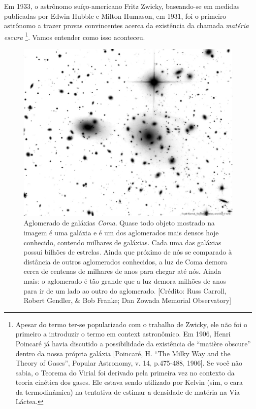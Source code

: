 \documentclass[]{IMTexam}
\author{Isabella B.}
\date{}
\begin{document}
\maketitle

\begin{questions}

	 \label{ques:q1}

	Em 1933, o astrônomo suíço-americano Fritz Zwicky, baseando-se em medidas publicadas por Edwin Hubble e Milton Humason, em 1931, foi o primeiro astrônomo a trazer provas convincentes acerca da existência da chamada \textit{matéria escura}%
	\footnote{Apesar do termo ter-se popularizado com o trabalho de Zwicky, ele não foi o primeiro a introduzir o termo em context astronômico. Em 1906, Henri Poincaré já havia discutido a possibilidade da existência de “matière obscure” dentro da nossa própria galáxia [Poincaré, H. “The Milky Way and the Theory of Gases”, Popular Astronomy, v. 14, p.475-488, 1906]. Se você não sabia, o Teorema do Virial foi derivado pela primeira vez no contexto da teoria cinética dos gases. Ele estava sendo utilizado por Kelvin (sim, o cara da termodinâmica) na tentativa de estimar a densidade de matéria na Via Láctea.}. Vamos entender como isso aconteceu.

	\begin{figure}[H]
		\centering
		\includegraphics[width=0.4\linewidth]{screenshot001}
		\caption{Aglomerado de galáxias \textit{Coma}. Quase todo objeto mostrado na imagem é uma galáxia e é um dos aglomerados mais densos hoje conhecido, contendo milhares de galáxias. Cada uma das galáxias possui bilhões de estrelas. Ainda que próximo de nós se comparado à distância de outros aglomerados conhecidos, a luz de Coma demora cerca de centenas de milhares de anos para chegar até nós. Ainda mais: o aglomerado é tão grande que a luz demora milhões de anos para ir de um lado ao outro do aglomerado. [Crédito: Russ Carroll, Robert Gendler, \& Bob Franke; Dan Zowada Memorial Observatory]}
		\label{fig:fig1}
	\end{figure}


\end{questions}
\end{document}
